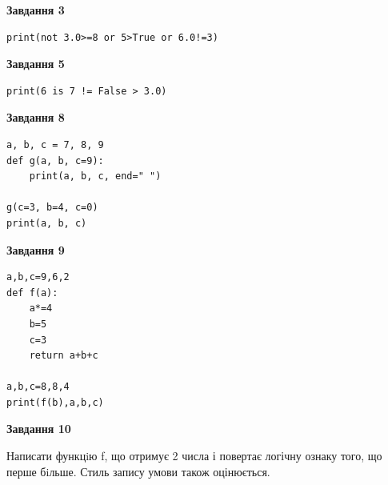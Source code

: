 \documentclass[12pt, ukrainian]{article}
\begin{document}
{\begin {large}
\begin{minipage}[t]{7.5cm}
\end{minipage}
\vline \hspace{6mm}
\begin{minipage}[t]{10.5cm}

\begin{center}
\textbf{Завдання 3}
\end{center}

\begin{verbatim}
print(not 3.0>=8 or 5>True or 6.0!=3)
\end{verbatim}



\begin{center}
\textbf{Завдання 5}
\end{center}

\begin{verbatim}
print(6 is 7 != False > 3.0)
\end{verbatim}



\begin{center}
\textbf{Завдання 8}
\end{center}

\begin{verbatim}
a, b, c = 7, 8, 9
def g(a, b, c=9):
    print(a, b, c, end=" ")

g(c=3, b=4, c=0)
print(a, b, c)
\end{verbatim}



\begin{center}
\textbf{Завдання 9}
\end{center}

\begin{verbatim}
a,b,c=9,6,2
def f(a):
    a*=4
    b=5
    c=3
    return a+b+c

a,b,c=8,8,4
print(f(b),a,b,c)
\end{verbatim}



\begin{center}
\textbf{Завдання 10}
\end{center}

Написати функцiю f, що отримує 2 числа і повертає логічну ознаку того, що перше бiльше. Стиль запису умови також оцінюється.\par

\end{minipage}

\end {large}}
\newpage
\end{document}

